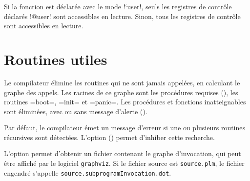 Si la fonction est déclarée avec le mode \plm!`user!, seuls les registres de contrôle déclarés \plm!@user! sont accessibles en lecture. Sinon, tous les registres de contrôle sont accessibles en lecture.











\section{Routines utiles}

Le compilateur élimine les routines qui ne sont jamais appelées, en calculant le graphe des appels. Les racines de ce graphe sont les procédures requises (), les routines \plm=boot=, \plm=init= et \plm=panic=. Les procédures et fonctions inatteignables sont éliminées, avec ou sans message d'alerte ().












Par défaut, le compilateur émet un message d'erreur si une ou plusieurs routines récursives sont détectées. L'option  () permet d'inhiber cette recherche.

L'option  permet d'obtenir un fichier contenant le graphe d'invocation, qui peut être affiché par le logiciel \texttt{graphviz}. Si le fichier source est \texttt{source.plm}, le fichier engendré s'appelle \texttt{source.subprogramInvocation.dot}.

